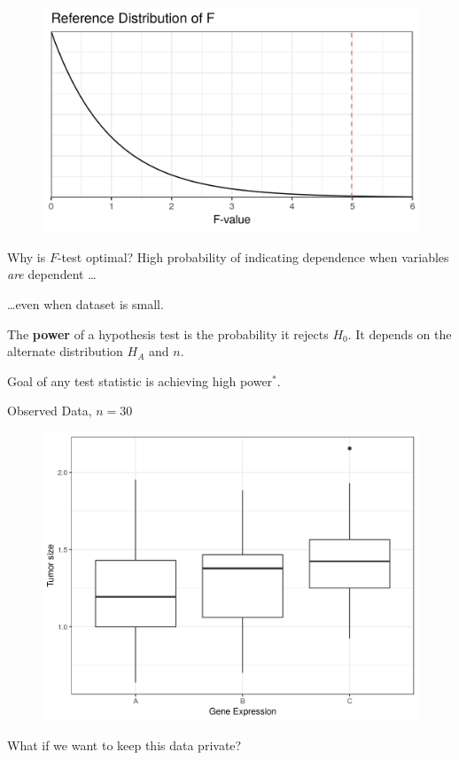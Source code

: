 \documentclass{beamer}
\begin{document}
\begin{frame}{}
\begin{figure}
  \includegraphics[scale=0.9]{simulation/null-dist}
\end{figure} 
\end{frame}

\begin{frame}{Why is $F$-test optimal?}
\pause
High probability of indicating dependence when variables \emph{are} dependent \ldots\pause  

\bigskip
\ldots even when dataset is small.

\pause
\begin{definition}[Power]
The \textbf{power} of a hypothesis test is the probability it rejects $H_0$.  It depends on the alternate distribution $H_A$ and $n$.
\end{definition}
\bigskip 

\pause
Goal of any test statistic is achieving high power$^*$.
\end{frame}

\begin{frame}{Observed Data, $n=30$}
\begin{figure}
  \includegraphics[scale=0.5]{simulation/observed-plot}
\end{figure}
What if we want to keep this data private?
\end{frame}
\end{document}
